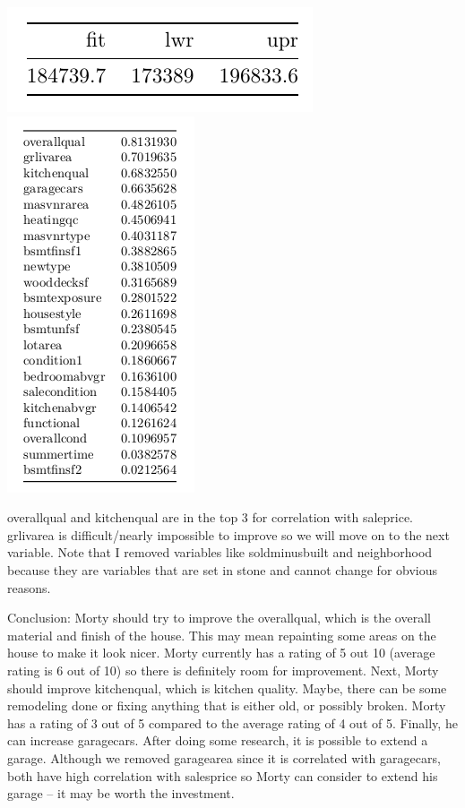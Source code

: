 \documentclass[12pt]{article}
\begin{document}
\begin{flushleft}
\begin{flushleft}
\begin{flushleft}
\centering
    \vspace*{0.5 cm}
    \includegraphics[scale = 0.5]{confint.png}\\[1.0 cm]	

\centering
    \vspace*{0.5 cm}
    \includegraphics[scale = 0.5]{cor.png}\\[1.0 cm]	
    
\begin{flushleft}
overallqual and kitchenqual are in the top 3 for correlation with saleprice. grlivarea is difficult/nearly impossible to improve so we will move on to the next variable. Note that I removed variables like soldminusbuilt and neighborhood because they are variables that are set in stone and cannot change for obvious reasons.

Conclusion: Morty should try to improve the overallqual, which is the overall material and finish of the house. This may mean repainting some areas on the house to make it look nicer. Morty currently has a rating of 5 out 10 (average rating is 6 out of 10) so there is definitely room for improvement. Next, Morty should improve kitchenqual, which is kitchen quality. Maybe, there can be some remodeling done or fixing anything that is either old, or possibly broken. Morty has a rating of 3 out of 5 compared to the average rating of 4 out of 5. Finally, he can increase garagecars. After doing some research, it is possible to extend a garage. Although we removed garagearea since it is correlated with garagecars, both have high correlation with salesprice so Morty can consider to extend his garage -- it may be worth the investment. 


\end{flushleft}
\end{flushleft}
\end{flushleft}
\end{flushleft}
\end{document}
